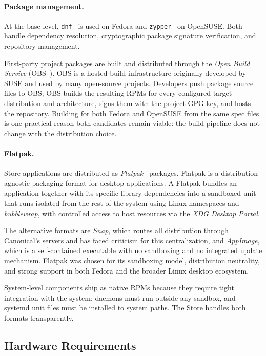 \paragraph{Package management.}
At the base level, \texttt{dnf}~\cite{dnf} is
used on Fedora and
\texttt{zypper}~\cite{zypper} on
OpenSUSE. Both handle dependency resolution, cryptographic package signature
verification, and repository management.

First-party project packages are built and distributed through the \emph{Open
Build Service}
(OBS~\cite{obs}). OBS is a hosted build
infrastructure originally developed by SUSE and used by many open-source
projects. Developers push package source files to OBS; OBS builds the resulting
RPMs for every configured target distribution and architecture, signs them with
the project GPG key, and hosts the repository. Building for both Fedora and
OpenSUSE from the same spec files is one practical reason both candidates remain
viable: the build pipeline does not change with the distribution choice.

\paragraph{Flatpak.}
Store applications are distributed as
\emph{Flatpak}~\cite{archwiki:flatpak}
packages. Flatpak is a distribution-agnostic packaging format for desktop
applications. A Flatpak bundles an application together with its specific
library dependencies into a sandboxed unit that runs isolated from the rest of
the system using Linux namespaces and \emph{bubblewrap}, with controlled access
to host resources via the \emph{XDG Desktop Portal}.

The alternative formats are \emph{Snap}, which routes all distribution through
Canonical's servers and has faced criticism for this centralization, and
\emph{AppImage}, which is a self-contained executable with no sandboxing and no
integrated update mechanism. Flatpak was chosen for its sandboxing model,
distribution neutrality, and strong support in both Fedora and the broader Linux
desktop ecosystem.

System-level components ship as native RPMs because they require tight
integration with the system: daemons must run outside any sandbox, and systemd
unit files must be installed to system paths. The Store handles both formats
transparently.

\subsection{Hardware Requirements}
\label{sec:hardware}

